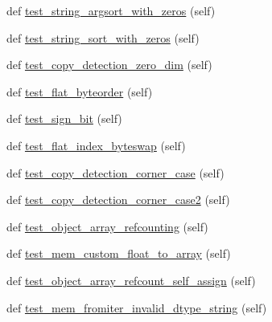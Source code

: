 \begin{DoxyCompactItemize}
\item 
def \hyperlink{classnumpy_1_1core_1_1tests_1_1test__regression_1_1TestRegression_ae36ec1d771a53973ba5dfbe9a3dd9bbb}{test\+\_\+string\+\_\+argsort\+\_\+with\+\_\+zeros} (self)
\item 
def \hyperlink{classnumpy_1_1core_1_1tests_1_1test__regression_1_1TestRegression_a46ef13c6cdbb5e553c00dc6e3b43691b}{test\+\_\+string\+\_\+sort\+\_\+with\+\_\+zeros} (self)
\item 
def \hyperlink{classnumpy_1_1core_1_1tests_1_1test__regression_1_1TestRegression_ab0f780c97b2776bcd22d06b91dc93d90}{test\+\_\+copy\+\_\+detection\+\_\+zero\+\_\+dim} (self)
\item 
def \hyperlink{classnumpy_1_1core_1_1tests_1_1test__regression_1_1TestRegression_a0b10488c81538af6e99575abe45cb720}{test\+\_\+flat\+\_\+byteorder} (self)
\item 
def \hyperlink{classnumpy_1_1core_1_1tests_1_1test__regression_1_1TestRegression_a1b012d58144055ea388cf7c98480d3ee}{test\+\_\+sign\+\_\+bit} (self)
\item 
def \hyperlink{classnumpy_1_1core_1_1tests_1_1test__regression_1_1TestRegression_a3ab8ada8c1ca4a44d1acfadb31f59aec}{test\+\_\+flat\+\_\+index\+\_\+byteswap} (self)
\item 
def \hyperlink{classnumpy_1_1core_1_1tests_1_1test__regression_1_1TestRegression_a0e577412346b9cc392cfa50bf4af4cb0}{test\+\_\+copy\+\_\+detection\+\_\+corner\+\_\+case} (self)
\item 
def \hyperlink{classnumpy_1_1core_1_1tests_1_1test__regression_1_1TestRegression_a25500727da33ded6e16b7384173c326b}{test\+\_\+copy\+\_\+detection\+\_\+corner\+\_\+case2} (self)
\item 
def \hyperlink{classnumpy_1_1core_1_1tests_1_1test__regression_1_1TestRegression_a87e93e49f7b8ac8d1ee70b54e00b533c}{test\+\_\+object\+\_\+array\+\_\+refcounting} (self)
\item 
def \hyperlink{classnumpy_1_1core_1_1tests_1_1test__regression_1_1TestRegression_a1f7ae82ff6eef8488530d7497395d034}{test\+\_\+mem\+\_\+custom\+\_\+float\+\_\+to\+\_\+array} (self)
\item 
def \hyperlink{classnumpy_1_1core_1_1tests_1_1test__regression_1_1TestRegression_acea5ea2c03cad20c73dca658b3d45f26}{test\+\_\+object\+\_\+array\+\_\+refcount\+\_\+self\+\_\+assign} (self)
\item 
def \hyperlink{classnumpy_1_1core_1_1tests_1_1test__regression_1_1TestRegression_ad4bfc8f0880a5b0358c22c1fe2caf195}{test\+\_\+mem\+\_\+fromiter\+\_\+invalid\+\_\+dtype\+\_\+string} (self)

\end{DoxyCompactItemize}

